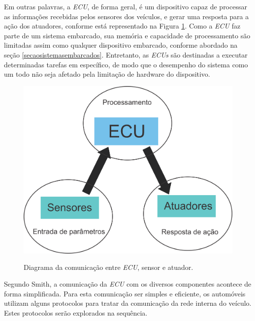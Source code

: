 Em outras palavras, a \textit{ECU}, de forma geral, é um dispositivo capaz de processar as informações recebidas pelos sensores dos veículos, e gerar uma resposta para a ação dos atuadores, conforme está representado na Figura \ref{Fig:relacao_ecu_sensor_atuador}. Como a \textit{ECU} faz parte de um sistema embarcado, sua memória e capacidade de processamento são limitadas assim como qualquer dispositivo embarcado, conforme abordado na seção \ref{secaosistemasembarcados}. Entretanto, as \textit{ECUs} são destinadas a executar determinadas tarefas em específico, de modo que o desempenho do sistema como um todo não seja afetado pela limitação de hardware do dispositivo.

\begin{figure}[!ht]
\centering
\caption{Diagrama da comunicação entre \textit{ECU}, sensor e atuador.} 
{\includegraphics[scale=.34]{imagens/ecuSensorAtuador.png}}\\
 \label{Fig:relacao_ecu_sensor_atuador}
\end{figure}

Segundo Smith, a comunicação da \textit{ECU} com os diversos componentes acontece de forma simplificada. Para esta comunicação ser simples e eficiente, os automóveis utilizam alguns protocolos para tratar da comunicação da rede interna do veículo. Estes protocolos serão explorados na sequência.

